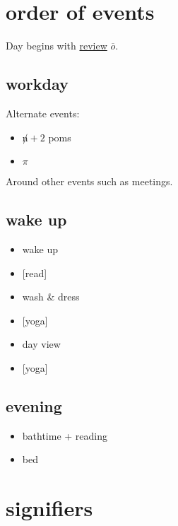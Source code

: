 \documentclass[]{book}
\providecommand{\tightlist}{%
  \setlength{\itemsep}{0pt}\setlength{\parskip}{0pt}}
\begin{document}
\hypertarget{dayview:order-of-events}{%
\section{order of events}\label{dayview:order-of-events}}

Day begins with \protect\hyperlink{review}{review} \(\overline o\).

\hypertarget{workday}{%
\subsection{workday}\label{workday}}

Alternate events:

\begin{itemize}
\tightlist
\item
  \(\not n + 2\) poms
\item
  \(\pi\)
\end{itemize}

Around other events such as meetings.

\hypertarget{wake-up}{%
\subsection{wake up}\label{wake-up}}

\begin{itemize}
\tightlist
\item
  wake up
\item
  {[}read{]}
\item
  wash \& dress
\item
  {[}yoga{]}
\item
  \protect\hypertarget{day-view}{}{day view}
\item
  {[}yoga{]}
\end{itemize}

\hypertarget{evening}{%
\subsection{evening}\label{evening}}

\begin{itemize}
\tightlist
\item
  bathtime + reading
\item
  bed
\end{itemize}

\hypertarget{signifiers}{%
\section{signifiers}\label{signifiers}}
\end{document}
